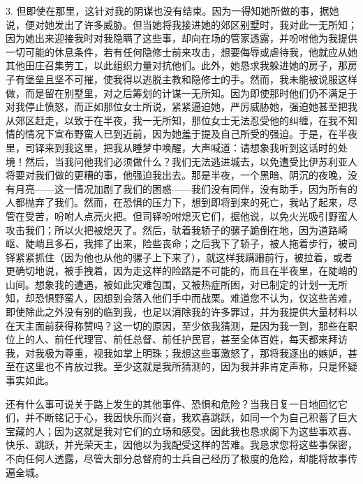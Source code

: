 3. 但即使在那里，这针对我的阴谋也没有结束。因为一得知她所做的事，据她说，便对她发出了许多威胁。但当她将我接进她的郊区别墅时，我对此一无所知；因为她出来迎接我时对我隐瞒了这些事，却向在场的管家透露，并吩咐他为我提供一切可能的休息条件，若有任何隐修士前来攻击，想要侮辱或虐待我，他就应从她其他田庄召集劳工，以此组织力量对抗他们。此外，她恳求我躲进她的房子，那房子有堡垒且坚不可摧，使我得以逃脱主教和隐修士的手。然而，我未能被说服这样做，而是留在别墅里，对之后筹划的计谋一无所知。因为即使那时他们仍不满足于对我停止愤怒，而正如那位女士所说，紧紧逼迫她，严厉威胁她，强迫她甚至把我从郊区赶走，以致于在半夜，我一无所知，那位女士无法忍受他的纠缠，在我不知情的情况下宣布野蛮人已到近前，因为她羞于提及自己所受的强迫。于是，在半夜里，司铎来到我这里，把我从睡梦中唤醒，大声喊道：请想象我听到这话时的处境！然后，当我问他我们必须做什么？我们无法逃进城去，以免遭受比伊苏利亚人将要对我们做的更糟的事，他强迫我出去。那是半夜，一个黑暗、阴沉的夜晚，没有月亮——这一情况加剧了我们的困惑——我们没有同伴，没有助手，因为所有的人都抛弃了我们。然而，在恐惧的压力下，想到即将到来的死亡，我站了起来，尽管在受苦，吩咐人点亮火把。但司铎吩咐熄灭它们，据他说，以免火光吸引野蛮人攻击我们；所以火把被熄灭了。然后，驮着我轿子的骡子跪倒在地，因为道路崎岖、陡峭且多石，我摔了出来，险些丧命；之后我下了轿子，被人拖着步行，被司铎紧紧抓住（因为他也从他的骡子上下来了），就这样我蹒跚前行，被拉着，或者更确切地说，被手拽着，因为走这样的险路是不可能的，而且在半夜里，在陡峭的山间。想象我的遭遇，被如此灾难包围，又被热症所困，对已制定的计划一无所知，却恐惧野蛮人，因想到会落入他们手中而战栗。难道您不认为，仅这些苦难，即使除此之外没有别的临到我，也足以消除我的许多罪过，并为我提供大量材料以在天主面前获得称赞吗？这一切的原因，至少依我猜测，是因为我一到，那些在职位上的人、前任代理官、前任总督、前任护民官，甚至全体百姓，每天都来拜访我，对我极为尊重，视我如掌上明珠；我想这些事激怒了，那将我逐出的嫉妒，甚至在这里也不肯放过我。至少这就是我所猜测的，因为我并非肯定声称，只是怀疑事实如此。\par

还有什么事可说关于路上发生的其他事件、恐惧和危险？当我日复一日地回忆它们，并不断铭记于心，我因快乐而兴奋，我欢喜跳跃，如同一个为自己积蓄了巨大宝藏的人；因为这就是我对它们的立场和感受。因此我也恳求阁下为这些事欢喜、快乐、跳跃，并光荣天主，因他以为我配受这样的苦难。我恳求您将这些事保密，不向任何人透露，尽管大部分总督府的士兵自己经历了极度的危险，却能将故事传遍全城。\par


